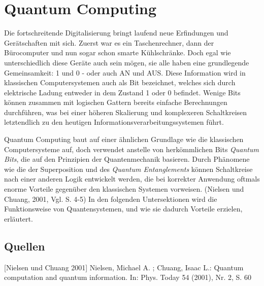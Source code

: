 \section{Quantum Computing}

Die fortschreitende Digitalisierung bringt laufend neue Erfindungen und Gerätschaften mit sich. Zuerst war es ein Taschenrechner, dann der Bürocomputer und nun sogar schon smarte Kühlschränke. Doch egal wie unterschiedlich diese Geräte auch sein mögen, sie alle haben eine grundlegende Gemeinsamkeit: 1 und 0 - oder auch AN und AUS. Diese Information wird in klassischen Computersystemen auch als Bit bezeichnet, welches sich durch elektrische Ladung entweder in dem Zustand 1 oder 0 befindet. Wenige Bits können zusammen mit logischen Gattern bereits einfache Berechnungen durchführen, was bei einer höheren Skalierung und komplexeren Schaltkreisen letztendlich zu den heutigen Informationsverarbeitungssystemen führt. \newline

Quantum Computing baut auf einer ähnlichen Grundlage wie die klassischen Computersysteme auf, doch verwendet anstelle von herkömmlichen Bits \textit{Quantum Bits}, die auf den Prinzipien der Quantenmechanik basieren. Durch Phänomene wie die der Superposition und des \textit{Quantum Entanglements} können Schaltkreise nach einer anderen Logik entwickelt werden, die bei korrekter Anwendung oftmals enorme Vorteile gegenüber den klassischen Systemen vorweisen. (Nielsen und Chuang, 2001, Vgl. S. 4-5) \newline
In den folgenden Untersektionen wird die Funktionsweise von Quantensystemen, und wie sie dadurch Vorteile erzielen, erläutert.

\newline \newline
{}



\newline \newline
\subsection{Quellen}
[Nielsen und Chuang 2001] Nielsen, Michael A. ; Chuang, Isaac L.: Quantum computation and quantum information. In: Phys. Today 54 (2001), Nr. 2, S. 60\newline